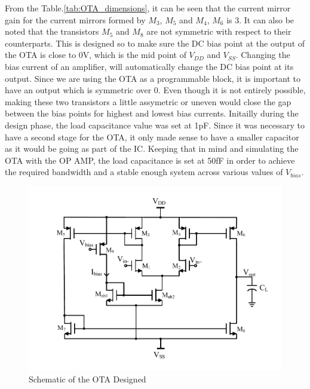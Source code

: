 From the Table.\ref{tab:OTA_dimensions}, it can be seen that the current mirror gain for the current mirrors formed by $M_{3}$, $M_{5}$ and $M_{4}$, $M_{6}$ is 3. It can also be noted that the transistors $M_{5}$ and $M_{8}$ are not symmetric with respect to their counterparts. This is designed so to make sure the DC bias point at the output of the OTA is close to 0V, which is the mid point of $V_{DD}$ and $V_{SS}$. Changing the bias current of an amplifier, will automatically change the DC bias point at its output. Since we are using the OTA as a programmable block, it is important to have an output which is symmetric over 0. Even though it is not entirely possible, making these two transistors a little assymetric or uneven would close the gap between the bias points for highest and lowest bias currents. Initailly during the design phase, the load capacitance value was set at 1pF. Since it was necessary to have a second stage for the OTA, it only made sense to have a smaller capacitor as it would be going as part of the IC. Keeping that in mind and simulating the OTA with the OP AMP, the load capacitance is set at 50fF in order to achieve the required bandwidth and a stable enough system across various values of $V_{bias}$.

\begin{figure} [H]
\centering
\includegraphics[scale=1]{Figures/Schematics/OTA_NMOS_Vbias.pdf}
\caption{Schematic of the OTA Designed}
\label{fig:OTA_Schematic}
\end{figure}

